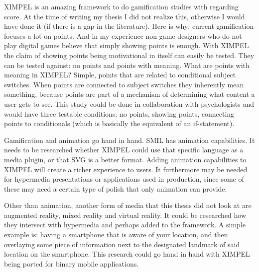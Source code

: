XIMPEL is an amazing framework to do gamification studies with regarding score. At the time of writing my thesis I did not realize this, otherwise I would have done it (if there is a gap in the literature). Here is why: current gamification focuses a lot on points. And in my experience non-game designers who do not play digital games believe that simply showing points is enough. With XIMPEL the claim of showing points being motivational in itself can easily be tested. They can be tested against: no points and points with meaning. What are points with meaning in XIMPEL? Simple, points that are related to conditional subject switches. When points are connected to subject switches they inherently mean something, because points are part of a mechanism of determining what content a user gets to see. This study could be done in collaboration with psychologists and would have three testable conditions: no points, showing points, connecting points to conditionals (which is basically the equivalent of an if-statement).

Gamification and animation go hand in hand. SMIL has animation capabilities. It needs to be researched whether XIMPEL could use that specific language as a media plugin, or that SVG is a better format. Adding animation capabilities to XIMPEL will create a richer experience to users. It furthermore may be needed for hypermedia presentations or applications used in production, since some of these may need a certain type of polish that only animation can provide.

Other than animation, another form of media that this thesis did not look at are augmented reality, mixed reality and virtual reality. It could be researched how they intersect with hypermedia and perhaps added to the framework. A simple example is: having a smartphone that is aware of your location, and then overlaying some piece of information next to the designated landmark of said location on the smartphone. This research could go hand in hand with XIMPEL being ported for binary mobile applications.

